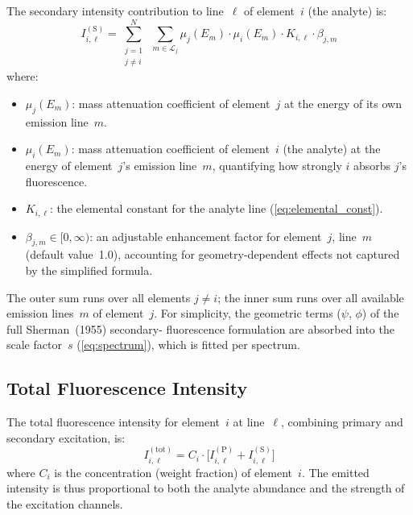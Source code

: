 \documentclass[journal,lettersize]{IEEEtran}
\begin{document}
The secondary intensity contribution to line~$\ell$ of
element~$i$ (the analyte) is:
\begin{equation}\label{eq:secondary}
  \boxed{
    I_{i,\ell}^{(\mathrm{S})} =
      \sum_{\substack{j=1\\j\neq i}}^{N}\;\sum_{m \in \mathcal{L}_j}
        \mu_j(E_m) \cdot \mu_i(E_m) \cdot K_{i,\ell} \cdot \beta_{j,m}
  }
\end{equation}
where:
\begin{itemize}[nosep]
  \item $\mu_j(E_m)$: mass attenuation coefficient of element~$j$ at the
        energy of its own emission line~$m$.
  \item $\mu_i(E_m)$: mass attenuation coefficient of element~$i$ (the
        analyte) at the energy of element~$j$'s emission line~$m$,
        quantifying how strongly $i$ absorbs $j$'s fluorescence.
  \item $K_{i,\ell}$: the elemental constant for the analyte line
        (\cref{eq:elemental_const}).
  \item $\beta_{j,m} \in [0,\infty)$: an adjustable enhancement factor
        for element~$j$, line~$m$ (default value~1.0), accounting for
        geometry-dependent effects not captured by the simplified
        formula.
\end{itemize}

The outer sum runs over all elements $j \neq i$; the inner sum runs over
all available emission lines~$m$ of element~$j$. For simplicity, the
geometric terms ($\psi$, $\phi$) of the full Sherman~(1955) secondary-
fluorescence formulation are absorbed into the scale factor~$s$
(\cref{eq:spectrum}), which is fitted per spectrum.

\subsection{Total Fluorescence Intensity}\label{sec:total}

The total fluorescence intensity for element~$i$ at line~$\ell$,
combining primary and secondary excitation, is:
\begin{equation}\label{eq:total_intensity}
  \boxed{
    I_{i,\ell}^{(\mathrm{tot})} = C_i \cdot \bigl[
      I_{i,\ell}^{(\mathrm{P})} + I_{i,\ell}^{(\mathrm{S})}
    \bigr]
  }
\end{equation}
where $C_i$ is the concentration (weight fraction) of element~$i$.
The emitted intensity is thus proportional to both the analyte abundance
and the strength of the excitation channels.
\end{document}
